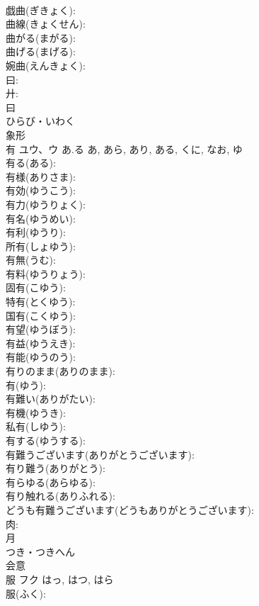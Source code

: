 \documentclass[8pt]{extreport}
\begin{document}
\begin{CJK}{UTF8}{min}
\\	戯曲(ぎきょく): 
\\	曲線(きょくせん): 
\\	曲がる(まがる): 
\\	曲げる(まげる): 
\\	婉曲(えんきょく): 
\\	曰: 
\\	廾: 
\\	曰	
\\	ひらび・いわく	
\\	象形 
\\	有	ユウ、ウ	あ.る	あ, あら, あり, ある, くに, なお, ゆ	
\\	有る(ある): 
\\	有様(ありさま): 
\\	有効(ゆうこう): 
\\	有力(ゆうりょく): 
\\	有名(ゆうめい): 
\\	有利(ゆうり): 
\\	所有(しょゆう): 
\\	有無(うむ): 
\\	有料(ゆうりょう): 
\\	固有(こゆう): 
\\	特有(とくゆう): 
\\	国有(こくゆう): 
\\	有望(ゆうぼう): 
\\	有益(ゆうえき): 
\\	有能(ゆうのう): 
\\	有りのまま(ありのまま): 
\\	有(ゆう): 
\\	有難い(ありがたい): 
\\	有機(ゆうき): 
\\	私有(しゆう): 
\\	有する(ゆうする): 
\\	有難うございます(ありがとうございます): 
\\	有り難う(ありがとう): 
\\	有らゆる(あらゆる): 
\\	有り触れる(ありふれる): 
\\	どうも有難うございます(どうもありがとうございます): 
\\	肉: 
\\	月	
\\	つき・つきへん	
\\	会意 
\\	服	フク		はっ, はつ, はら	
\\	服(ふく): 

\end{CJK}
\end{document}

